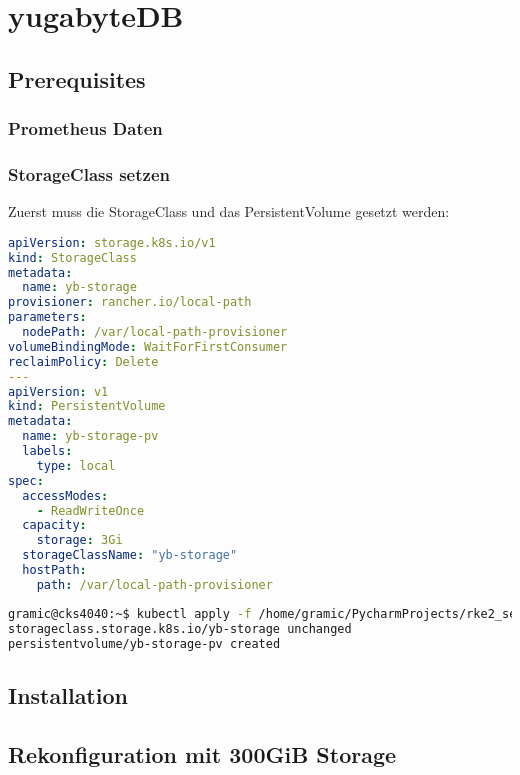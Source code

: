
\section{yugabyteDB}
%
\subsection{Prerequisites}
\subsubsection{Prometheus Daten}
\subsubsection{StorageClass setzen}
Zuerst muss die StorageClass und das PersistentVolume gesetzt werden:
\lstset{style=gra_codestyle}
\begin{lstlisting}[language=yaml, caption=yugabyteDB - StorageClass setzen,captionpos=b,label={lst:yugabytedb-storageclass-yaml},breaklines=true]
apiVersion: storage.k8s.io/v1
kind: StorageClass
metadata:
  name: yb-storage
provisioner: rancher.io/local-path
parameters:
  nodePath: /var/local-path-provisioner
volumeBindingMode: WaitForFirstConsumer
reclaimPolicy: Delete
---
apiVersion: v1
kind: PersistentVolume
metadata:
  name: yb-storage-pv
  labels:
    type: local
spec:
  accessModes:
    - ReadWriteOnce
  capacity:
    storage: 3Gi
  storageClassName: "yb-storage"
  hostPath:
    path: /var/local-path-provisioner
\end{lstlisting}

\lstset{style=gra_codestyle}
\begin{lstlisting}[language=bash, caption=yugabyteDB - StorageClass / PersistentVolume aktivieren,captionpos=b,label={lst:yugabytedb-storageclass-apply},breaklines=true]
gramic@cks4040:~$ kubectl apply -f /home/gramic/PycharmProjects/rke2_settings/yugabytedb/yugabytedb/storageclass.yaml
storageclass.storage.k8s.io/yb-storage unchanged
persistentvolume/yb-storage-pv created
\end{lstlisting}

\subsection{Installation}

\subsection{Rekonfiguration mit 300GiB Storage}